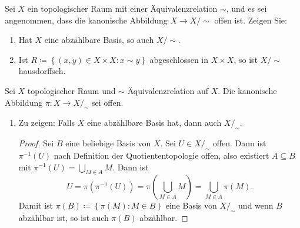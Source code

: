 \begin{assignment}
  Sei \( X \) ein topologischer Raum mit einer Äquivalenzrelation \( \sim \), und es sei angenommen, dass die kanonische Abbildung \( X \to X/\sim \) offen ist. Zeigen Sie:
  \begin{enumerate}[label=(\alph*)]
    \item Hat \( X \) eine abzählbare Basis, so auch \( X/\sim \).
    \item Ist \( R \coloneqq \left \{ (x,y) \in X \times X : x \sim y \right \} \) abgeschlossen in \( X \times X \), so ist \( X/\sim \) hausdorffsch.
  \end{enumerate}
\end{assignment}
\begin{solution}
  Sei \( X \) topologischer Raum und \( \sim \) Äquivalenzrelation auf \( X \). Die kanonische Abbildung \( \pi : X \to X/_\sim \) sei offen.
  \begin{enumerate}[label=(\alph*)]
    \item Zu zeigen: Falls \( X \) eine abzählbare Basis hat, dann auch \( X/_\sim \).
    \begin{proof}
      Sei \( B \) eine beliebige Basis von \( X \). Sei \( U \in X/_\sim \) offen. Dann ist \( \pi^{-1}(U) \) nach Definition der Quotiententopologie offen, also existiert \( A \subseteq B \) mit \( \pi^{-1}(U) = \bigcup_{M \in A}M \). Dann ist
      \begin{equation*}
        U = \pi(\pi^{-1}(U)) = \pi\left(\bigcup_{M \in A} M \right) = \bigcup_{M \in A} \pi(M)\text{.}
      \end{equation*}
      Damit ist \( \pi(B) \coloneqq \left \{ \pi(M): M \in B \right \} \) eine Basis von \( X/_\sim \) und wenn \( B \) abzählbar ist, so ist auch \( \pi(B) \) abzählbar.
    \end{proof}
    

\end{enumerate}
\end{solution}
